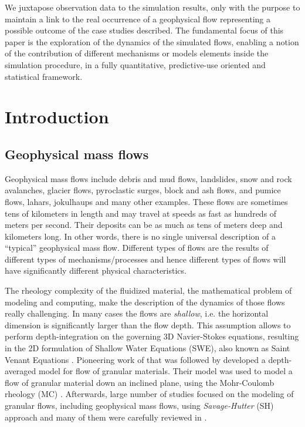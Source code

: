 \documentclass{article}
\begin{document}
We juxtapose observation data to the simulation results, only with the purpose to maintain a link to the real occurrence of a geophysical flow representing a possible outcome of the case studies described. The fundamental focus of this paper is the exploration of the dynamics of the simulated flows, enabling a notion of the contribution of different mechanisms or models elements inside the simulation procedure, in a fully quantitative, predictive-use oriented and statistical framework.

\newpage
\section{Introduction}\label{sec:Intro}

\subsection{Geophysical mass flows}\label{subsec:FlowTypes}
Geophysical mass flows include debris and mud flows, landslides, snow and rock avalanches, glacier flows, pyroclastic surges, block and ash flows, and pumice flows, lahars, jokulhaups and many other examples. These flows are sometimes tens of kilometers in length and may travel at speeds as fast as hundreds of meters per second. Their deposits can be as much as tens of meters deep and kilometers long. In other words, there is no single universal description of a ``typical'' geophysical mass flow. Different types of flows are the results of different types of mechanisms/processes and hence different types of flows will have significantly different physical characteristics.

The rheology complexity of the fluidized material, the mathematical problem of modeling and computing, make the description of the dynamics of those flows really challenging. In many cases the flows are \emph{shallow}, i.e. the horizontal dimension is significantly larger than the flow depth. This assumption allows to perform depth-integration on the governing 3D Navier-Stokes equations, resulting in the 2D formulation of Shallow Water Equations (SWE), also known as Saint Venant Equations \citep{Batchelor2000}. Pioneering work of \citep{SavageHutter1989} that was followed by \citep{Hutter1993} developed a depth-averaged model for flow of granular materials. Their model was used to model a flow of granular material down an inclined plane, using the Mohr-Coulomb rheology (MC) . %
Afterwards, large number of studies focused on the modeling of granular flows, including geophysical mass flows, using \emph{Savage-Hutter} (SH) approach and many of them were carefully reviewed in \cite{PudasainiHutter2007}.
\end{document}
